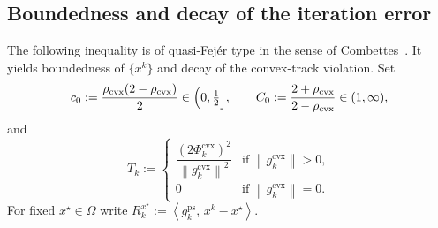 \documentclass[]{interact}
\theoremstyle{plain}
\theoremstyle{definition}
\theoremstyle{remark}
\newcommand{\norm}[1]{\left\lVert #1 \right\rVert}
\newcommand{\inner}[2]{\left\langle #1,\, #2 \right\rangle}
\newcommand{\cvx}{\mathrm{cvx}}
\newcommand{\ps}{\mathrm{ps}}
\begin{document}
\subsection{Boundedness and decay of the iteration error}\label{ssec:bounded}
The following inequality is of quasi-Fej\'er type in the sense of
Combettes~\citep{combettes2001quasifejer}. It yields boundedness of $\{x^k\}$ and decay of the
convex-track violation. Set
\begin{equation}\label{eq:c0C0}
c_0:=\frac{\rho_{\cvx}(2-\rho_{\cvx})}{2}\in\Bigl(0,\tfrac12\Bigr],\qquad
C_0:=\frac{2+\rho_{\cvx}}{2-\rho_{\cvx}}\in(1,\infty),
\end{equation}
and
\begin{equation}\label{eq:Tk}
T_k:=\begin{cases}\dfrac{(2\Phi^{\cvx}_k)^2}{\norm{g^{\cvx}_k}^2} & \text{if }\norm{g^{\cvx}_k}>0,\\ 0 & \text{if }\norm{g^{\cvx}_k}=0.\end{cases}
\end{equation}
For fixed $x^\star\in\Omega$ write $R^{x^\star}_k:=\inner{g^{\ps}_k}{x^k-x^\star}$.
\end{document}
